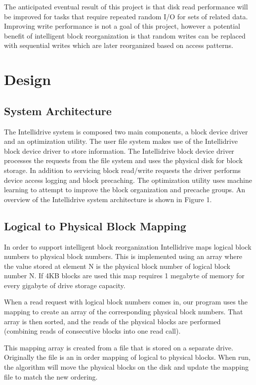 \documentclass[letterpaper,twocolumn,10pt]{article}
\begin{document}
The anticipated eventual result of this project is that disk read performance will be improved for tasks that require repeated random I/O for sets of related data.  Improving write performance is not a goal of this project, however a potential benefit of intelligent block reorganization is that random writes can be replaced with sequential writes which are later reorganized based on access patterns.

\section{Design}
\subsection{System Architecture}
The Intellidrive system is composed two main components, a block device driver and an optimization utility.  The user file system makes use of the Intellidrive block device driver to store information.  The Intellidrive block device driver processes the requests from the file system and uses the physical disk for block storage.  In addition to servicing block read/write requests the driver performs device access logging and block precaching.  The optimization utility uses machine learning to attempt to improve the block organization and precache groups.  An overview of the Intellidrive system architecture is shown in Figure 1.

\subsection{Logical to Physical Block Mapping}
In order to support intelligent block reorganization Intellidrive maps logical block numbers to physical block numbers.  This is implemented using an array where the value stored at element N is the physical block number of logical block number N.  If 4KB blocks are used this map requires 1 megabyte of memory for every gigabyte of drive storage capacity. 

When a read request with logical block numbers comes in, our program uses the mapping to create an array of the corresponding physical block numbers.  That array is then sorted, and the reads of the physical blocks are performed (combining reads of consecutive blocks into one read call).

This mapping array is created from a file that is stored on a separate drive.  Originally the file is an in order mapping of logical to physical blocks.  When run, the algorithm will move the physical blocks on the disk and update the mapping file to match the new ordering.
\end{document}
